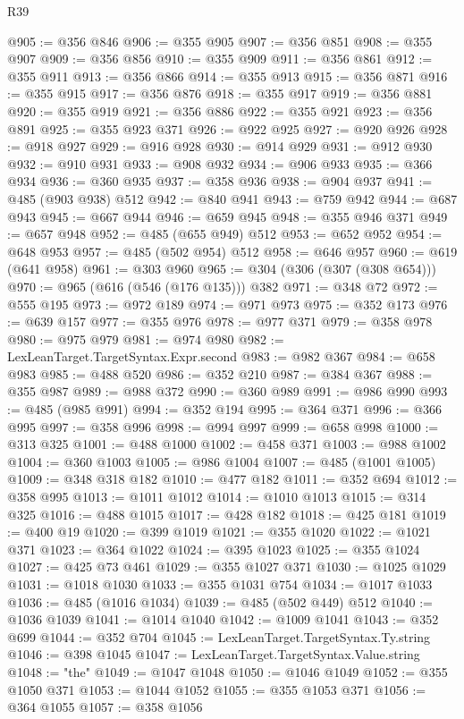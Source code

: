 \begin{lexlean}{R39}
\begin{coremodule}
@905 := @356 @846
@906 := @355 @905
@907 := @356 @851
@908 := @355 @907
@909 := @356 @856
@910 := @355 @909
@911 := @356 @861
@912 := @355 @911
@913 := @356 @866
@914 := @355 @913
@915 := @356 @871
@916 := @355 @915
@917 := @356 @876
@918 := @355 @917
@919 := @356 @881
@920 := @355 @919
@921 := @356 @886
@922 := @355 @921
@923 := @356 @891
@925 := @355 @923 @371
@926 := @922 @925
@927 := @920 @926
@928 := @918 @927
@929 := @916 @928
@930 := @914 @929
@931 := @912 @930
@932 := @910 @931
@933 := @908 @932
@934 := @906 @933
@935 := @366 @934
@936 := @360 @935
@937 := @358 @936
@938 := @904 @937
@941 := @485 (@903 @938) @512
@942 := @840 @941
@943 := @759 @942
@944 := @687 @943
@945 := @667 @944
@946 := @659 @945
@948 := @355 @946 @371
@949 := @657 @948
@952 := @485 (@655 @949) @512
@953 := @652 @952
@954 := @648 @953
@957 := @485 (@502 @954) @512
@958 := @646 @957
@960 := @619 (@641 @958)
@961 := @303 @960
@965 := @304 (@306 (@307 (@308 @654)))
@970 := @965 (@616 (@546 (@176 @135))) @382
@971 := @348 @72
@972 := @555 @195
@973 := @972 @189
@974 := @971 @973
@975 := @352 @173
@976 := @639 @157
@977 := @355 @976
@978 := @977 @371
@979 := @358 @978
@980 := @975 @979
@981 := @974 @980
@982 := LexLeanTarget.TargetSyntax.Expr.second
@983 := @982 @367
@984 := @658 @983
@985 := @488 @520
@986 := @352 @210
@987 := @384 @367
@988 := @355 @987
@989 := @988 @372
@990 := @360 @989
@991 := @986 @990
@993 := @485 (@985 @991)
@994 := @352 @194
@995 := @364 @371
@996 := @366 @995
@997 := @358 @996
@998 := @994 @997
@999 := @658 @998
@1000 := @313 @325
@1001 := @488 @1000
@1002 := @458 @371
@1003 := @988 @1002
@1004 := @360 @1003
@1005 := @986 @1004
@1007 := @485 (@1001 @1005)
@1009 := @348 @318 @182
@1010 := @477 @182
@1011 := @352 @694
@1012 := @358 @995
@1013 := @1011 @1012
@1014 := @1010 @1013
@1015 := @314 @325
@1016 := @488 @1015
@1017 := @428 @182
@1018 := @425 @181
@1019 := @400 @19
@1020 := @399 @1019
@1021 := @355 @1020
@1022 := @1021 @371
@1023 := @364 @1022
@1024 := @395 @1023
@1025 := @355 @1024
@1027 := @425 @73 @461
@1029 := @355 @1027 @371
@1030 := @1025 @1029
@1031 := @1018 @1030
@1033 := @355 @1031 @754
@1034 := @1017 @1033
@1036 := @485 (@1016 @1034)
@1039 := @485 (@502 @449) @512
@1040 := @1036 @1039
@1041 := @1014 @1040
@1042 := @1009 @1041
@1043 := @352 @699
@1044 := @352 @704
@1045 := LexLeanTarget.TargetSyntax.Ty.string
@1046 := @398 @1045
@1047 := LexLeanTarget.TargetSyntax.Value.string
@1048 := "the"
@1049 := @1047 @1048
@1050 := @1046 @1049
@1052 := @355 @1050 @371
@1053 := @1044 @1052
@1055 := @355 @1053 @371
@1056 := @364 @1055
@1057 := @358 @1056

\end{coremodule}
\end{lexlean}
